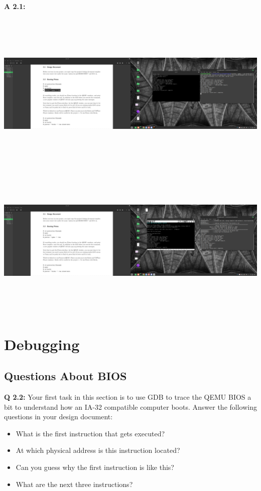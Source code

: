 \documentclass[a4paper,11pt]{paper}
\begin{document}
\textbf{A 2.1:}
\\\\
\includegraphics[height = 3in]{qemu.png}\\
\includegraphics[height=3in]{bochs.png}

\section{Debugging}

\subsection{Questions About BIOS}


\textbf{Q 2.2:} Your first task in this section is to use GDB to trace the QEMU BIOS a bit to understand how an IA-32 compatible computer boots. Answer the following questions in your design document: 
\begin{itemize}
    \item What is the first instruction that gets executed? 
    \item At which physical address is this instruction located? 
    \item Can you guess why the first instruction is like this?
    \item What are the next three instructions?
\end{itemize}
\end{document}
